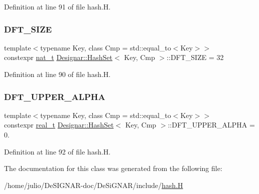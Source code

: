 Definition at line 91 of file hash.\+H.

\mbox{\label{class_designar_1_1_hash_set_a23c3da93ad9449838ab2c78526cd9dbd}} 
\subsubsection{\texorpdfstring{D\+F\+T\+\_\+\+S\+I\+ZE}{DFT\_SIZE}}
{\footnotesize\ttfamily template$<$typename Key, class Cmp = std\+::equal\+\_\+to$<$\+Key$>$$>$ \\
constexpr \hyperlink{namespace_designar_aa72662848b9f4815e7bf31a7cf3e33d1}{nat\+\_\+t} \hyperlink{class_designar_1_1_hash_set}{Designar\+::\+Hash\+Set}$<$ Key, Cmp $>$\+::D\+F\+T\+\_\+\+S\+I\+ZE = 32\hspace{0.3cm}{\ttfamily [static]}}



Definition at line 90 of file hash.\+H.

\mbox{\label{class_designar_1_1_hash_set_ab7e07181f29465aa1457e6abb9397be1}} 
\subsubsection{\texorpdfstring{D\+F\+T\+\_\+\+U\+P\+P\+E\+R\+\_\+\+A\+L\+P\+HA}{DFT\_UPPER\_ALPHA}}
{\footnotesize\ttfamily template$<$typename Key, class Cmp = std\+::equal\+\_\+to$<$\+Key$>$$>$ \\
constexpr \hyperlink{namespace_designar_aca2c32af26808dbec1f3a3071fad25ce}{real\+\_\+t} \hyperlink{class_designar_1_1_hash_set}{Designar\+::\+Hash\+Set}$<$ Key, Cmp $>$\+::D\+F\+T\+\_\+\+U\+P\+P\+E\+R\+\_\+\+A\+L\+P\+HA = 0.\hspace{0.3cm}{\ttfamily [static]}}



Definition at line 92 of file hash.\+H.



The documentation for this class was generated from the following file\+:\begin{DoxyCompactItemize}
\item 
/home/julio/\+De\+S\+I\+G\+N\+A\+R-\/doc/\+De\+Si\+G\+N\+A\+R/include/\hyperlink{hash_8_h}{hash.\+H}\end{DoxyCompactItemize}
